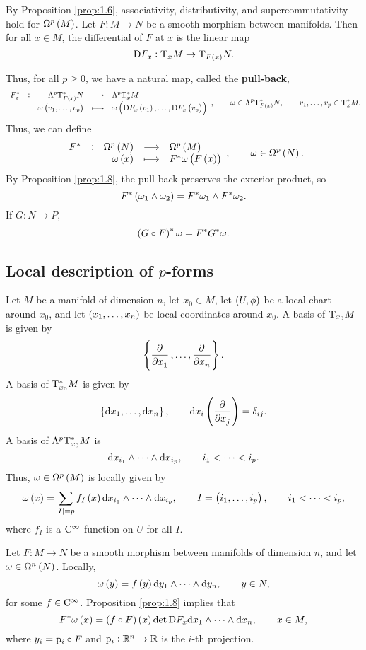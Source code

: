 By Proposition \ref{prop:1.6}, associativity, distributivity, and supercommutativity hold for $ \Omega^p\br{M} $. Let $ F : M \to N $ be a smooth morphism between manifolds. Then for all $ x \in M $, the differential of $ F $ at $ x $ is the linear map
$$ \D F_x : \T_xM \to \T_{F\br{x}}N. $$

\pagebreak

Thus, for all $ p \ge 0 $, we have a natural map, called the \textbf{pull-back},
$$ \function[F_x^*]{\Lambda^p\T_{F\br{x}}^*N}{\Lambda^p\T_x^*M}{\omega\br{v_1, \dots, v_p}}{\omega\br{\D F_x\br{v_1}, \dots, \D F_x\br{v_p}}}, \qquad \omega \in \Lambda^p\T_{F\br{x}}^*N, \qquad v_1, \dots, v_p \in \T_x^*M. $$
Thus, we can define
$$ \function[F^*]{\Omega^p\br{N}}{\Omega^p\br{M}}{\omega\br{x}}{F^*\omega\br{F\br{x}}}, \qquad \omega \in \Omega^p\br{N}. $$
By Proposition \ref{prop:1.8}, the pull-back preserves the exterior product, so
$$ F^*\br{\omega_1 \wedge \omega_2} = F^*\omega_1 \wedge F^*\omega_2. $$
If $ G : N \to P $,
$$ \br{G \circ F}^*\omega = F^*G^*\omega. $$

\subsection{Local description of \texorpdfstring{$ p $}{p}-forms}

Let $ M $ be a manifold of dimension $ n $, let $ x_0 \in M $, let $ \br{U, \phi} $ be a local chart around $ x_0 $, and let $ \br{x_1, \dots, x_n} $ be local coordinates around $ x_0 $. A basis of $ \mathrm{T}_{x_0}M $ is given by
$$ \cbr{\dpd{}{x_1}, \dots, \dpd{}{x_n}}. $$
A basis of $ \mathrm{T}_{x_0}^*M $ is given by
$$ \cbr{\d x_1, \dots, \d x_n}, \qquad \d x_i\br{\dpd{}{x_j}} = \delta_{ij}. $$
A basis of $ \Lambda^p\mathrm{T}_{x_0}^*M $ is
$$ \mathrm{d} x_{i_1} \wedge \dots \wedge \mathrm{d} x_{i_p}, \qquad i_1 < \dots < i_p. $$
Thus, $ \omega \in \Omega^p\br{M} $ is locally given by
$$ \omega\br{x} = \sum_{\abs{I} = p} f_I\br{x} \d x_{i_1} \wedge \dots \wedge \d x_{i_p}, \qquad I = \br{i_1, \dots, i_p}, \qquad i_1 < \dots < i_p, $$
where $ f_I $ is a $ \mathrm{C}^\infty $-function on $ U $ for all $ I $.

\begin{example}
Let $ F : M \to N $ be a smooth morphism between manifolds of dimension $ n $, and let $ \omega \in \Omega^n\br{N} $. Locally,
$$ \omega\br{y} = f\br{y} \d y_1 \wedge \dots \wedge \d y_n, \qquad y \in N, $$
for some $ f \in \mathrm{C}^\infty $. Proposition \ref{prop:1.8} implies that
$$ F^*\omega\br{x} = \br{f \circ F}\br{x}\det \D F_x \d x_1 \wedge \dots \wedge \d x_n, \qquad x \in M, $$
where $ y_i = \mathrm{p}_i \circ F $ and $ \mathrm{p}_i : \mathbb{R}^n \to \mathbb{R} $ is the $ i $-th projection.
\end{example}

